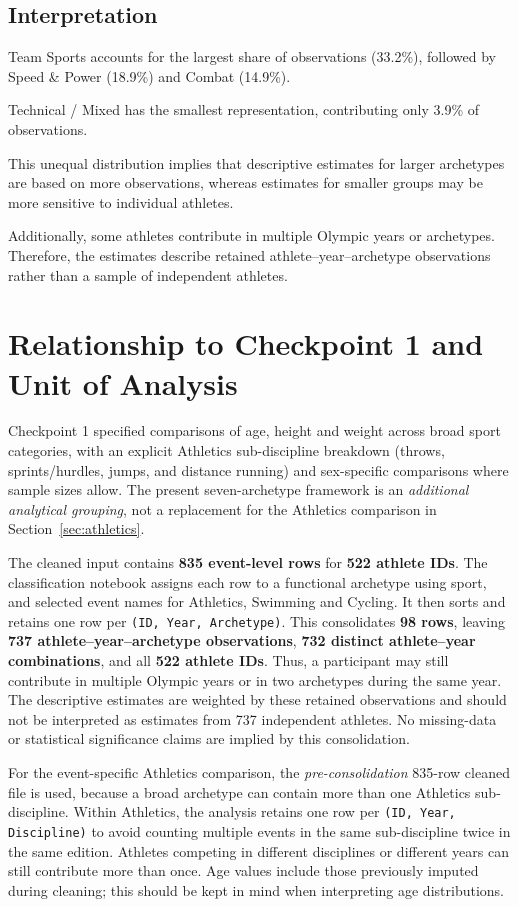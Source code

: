 \documentclass[11pt,a4paper]{article}
\begin{document}
\subsection*{Interpretation}

Team Sports accounts for the largest share of
observations (33.2\%), followed by Speed \& Power
(18.9\%) and Combat (14.9\%).

Technical / Mixed has the smallest representation,
contributing only 3.9\% of observations.

This unequal distribution implies that descriptive
estimates for larger archetypes are based on more
observations, whereas estimates for smaller groups
may be more sensitive to individual athletes.

Additionally, some athletes contribute in multiple Olympic years or
archetypes. Therefore, the estimates describe retained athlete--year--archetype
observations rather than a sample of independent athletes.


\section{Relationship to Checkpoint 1 and Unit of Analysis}
Checkpoint 1 specified comparisons of age, height and weight across broad sport
categories, with an explicit Athletics sub-discipline breakdown (throws,
sprints/hurdles, jumps, and distance running) and sex-specific comparisons
where sample sizes allow. The present seven-archetype framework is an
\emph{additional analytical grouping}, not a replacement for the Athletics
comparison in Section~\ref{sec:athletics}.

The cleaned input contains \textbf{835 event-level rows} for \textbf{522
athlete IDs}. The classification notebook assigns each row to a functional
archetype using sport, and selected event names for Athletics, Swimming and
Cycling. It then sorts and retains one row per
\texttt{(ID, Year, Archetype)}. This consolidates \textbf{98 rows}, leaving
\textbf{737 athlete--year--archetype observations}, \textbf{732 distinct
athlete--year combinations}, and all \textbf{522 athlete IDs}. Thus, a
participant may still contribute in multiple Olympic years or in two
archetypes during the same year. The descriptive estimates are weighted by
these retained observations and should not be interpreted as estimates from
737 independent athletes. No missing-data or statistical significance claims
are implied by this consolidation.

For the event-specific Athletics comparison, the \emph{pre-consolidation}
835-row cleaned file is used, because a broad archetype can contain more
than one Athletics sub-discipline. Within Athletics, the analysis retains one
row per \texttt{(ID, Year, Discipline)} to avoid counting multiple events in
the same sub-discipline twice in the same edition. Athletes competing in
different disciplines or different years can still contribute more than once.
Age values include those previously imputed during cleaning; this should be
kept in mind when interpreting age distributions.
\end{document}

